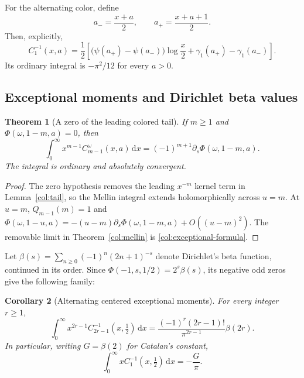 \documentclass[11pt,a4paper]{article}
\numberwithin{equation}{section}
\newtheorem{theorem}{Theorem}[section]
\newtheorem{corollary}[theorem]{Corollary}
\theoremstyle{definition}
\theoremstyle{remark}
\newcommand{\dd}{\,\mathrm d}
\begin{document}
For the alternating color, define
\[
 a_-=\frac{x+a}{2},\qquad a_+=\frac{x+a+1}{2}.
\]
Then, explicitly,
\begin{equation}\label{col:alternating-C1}
 C_1^{-1}(x,a)=\frac12\left[
    \bigl(\psi(a_+)-\psi(a_-)\bigr)\log\frac x2
                 +\gamma_1(a_+)-\gamma_1(a_-)\right].
\end{equation}
Its ordinary integral is $-\pi^2/12$ for every $a>0$.

\subsection{Exceptional moments and Dirichlet beta values}

\begin{theorem}[A zero of the leading colored tail]\label{col:exceptional}
If $m\ge1$ and $\Phi(\omega,1-m,a)=0$, then
\begin{equation}\label{col:exceptional-formula}
 \boxed{\displaystyle
 \int_0^\infty x^{m-1}C_{m-1}^\omega(x,a)\dd x
       =(-1)^{m+1}\partial_s\Phi(\omega,1-m,a).}
\end{equation}
The integral is ordinary and absolutely convergent.
\end{theorem}

\begin{proof}
The zero hypothesis removes the leading $x^{-m}$ kernel term in
Lemma~\ref{col:tail}, so the Mellin integral extends
holomorphically across $u=m$. At $u=m$, $Q_{m-1}(m)=1$ and
$\Phi(\omega,1-u,a)=-(u-m)\partial_s\Phi(\omega,1-m,a)
 +O((u-m)^2)$. The removable limit in
Theorem~\ref{col:mellin} is \eqref{col:exceptional-formula}.
\end{proof}

Let $\beta(s)=\sum_{n\ge0}(-1)^n(2n+1)^{-s}$ denote Dirichlet's beta
function, continued in its order. Since
$\Phi(-1,s,1/2)=2^s\beta(s)$, its negative odd zeros give the following
family:
\begin{corollary}[Alternating centered exceptional moments]\label{col:beta}
For every integer $r\ge1$,
\begin{equation}\label{col:beta-formula}
 \boxed{\displaystyle
 \int_0^\infty x^{2r-1}C_{2r-1}^{-1}(x,\tfrac12)\dd x
   =\frac{(-1)^r(2r-1)!}{\pi^{2r-1}}\beta(2r).}
\end{equation}
In particular, writing $G=\beta(2)$ for Catalan's constant,
\begin{equation}\label{col:catalan}
 \int_0^\infty xC_1^{-1}(x,\tfrac12)\dd x=-\frac G\pi.
\end{equation}
\end{corollary}
\end{document}
